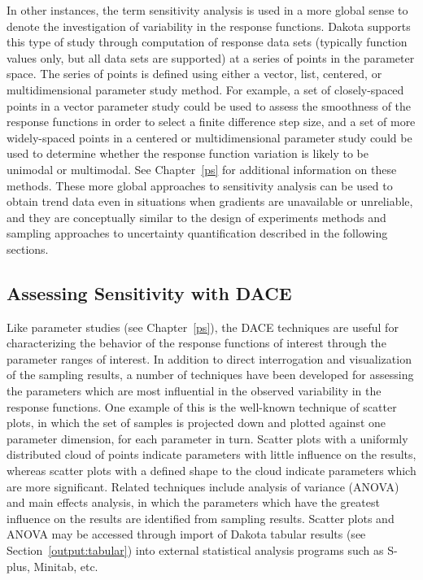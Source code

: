 In other instances, the term sensitivity analysis is used in a more
global sense to denote the investigation of variability in the
response functions. Dakota supports this type of study through
computation of response data sets (typically function values only, but
all data sets are supported) at a series of points in the parameter
space. The series of points is defined using either a vector, list,
centered, or multidimensional parameter study method. For example, a
set of closely-spaced points in a vector parameter study could be used
to assess the smoothness of the response functions in order to select
a finite difference step size, and a set of more widely-spaced points
in a centered or multidimensional parameter study could be used to
determine whether the response function variation is likely to be
unimodal or multimodal. See Chapter~\ref{ps} for additional
information on these methods. These more global approaches to
sensitivity analysis can be used to obtain trend data even in
situations when gradients are unavailable or unreliable, and they are
conceptually similar to the design of experiments methods and sampling
approaches to uncertainty quantification described in the following
sections.

\subsection{Assessing Sensitivity with DACE}\label{dace:sa:assessing}

Like parameter studies (see Chapter~\ref{ps}), the DACE techniques are
useful for characterizing the behavior of the response functions of
interest through the parameter ranges of interest. In addition to
direct interrogation and visualization of the sampling results, a
number of techniques have been developed for assessing the parameters
which are most influential in the observed variability in the response
functions. One example of this is the well-known technique of scatter
plots, in which the set of samples is projected down and plotted
against one parameter dimension, for each parameter in turn. Scatter
plots with a uniformly distributed cloud of points indicate parameters
with little influence on the results, whereas scatter plots with a
defined shape to the cloud indicate parameters which are more
significant. Related techniques include analysis of variance
(ANOVA)~\cite{Mye95} and main effects analysis, in which the parameters
which have the greatest influence on the results are identified from
sampling results. Scatter plots and ANOVA may be accessed through
import of Dakota tabular results (see Section~\ref{output:tabular})
into external statistical analysis programs such as S-plus, Minitab,
etc.


